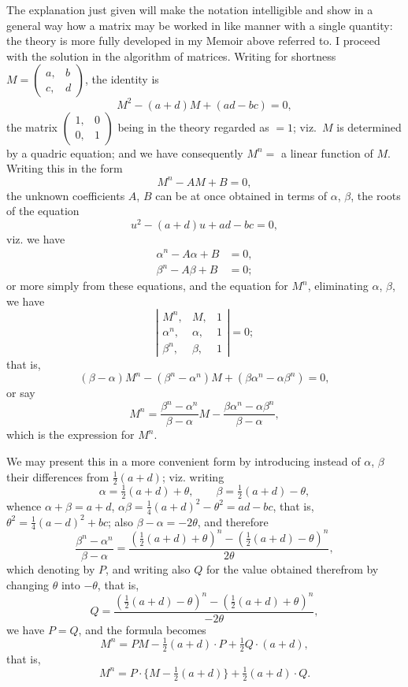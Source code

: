 \documentclass[11pt,a4paper]{book}
\begin{document}
The explanation just given will make the notation intelligible and show in a
general way how a matrix may be worked in like manner with a single quantity:
the theory is more fully developed in my Memoir above referred to. I proceed
with the solution in the algorithm of matrices. Writing for shortness
$M = \left(\begin{array}{c|c} a, & b \\ \hline c, & d \end{array}\right)$,
the identity is
%
\[
M^2 - (a+d)M + (ad-bc) = 0,
\]
%
the matrix $\left(\begin{array}{c|c} 1, & 0 \\ \hline 0, & 1 \end{array}\right)$ being in the theory regarded as $=1$;
viz.\ $M$ is determined by a quadric equation; and we have consequently $M^n =$
a linear function of $M$. Writing this in the form
%
\[
M^n - AM + B = 0,
\]
%
the unknown coefficients $A$, $B$ can be at once obtained in terms of $\alpha$, $\beta$, the roots
of the equation
%
\[
u^2 - (a+d)u + ad - bc = 0,\]
%
viz. we have
\begin{align*}
\alpha^n - A\alpha + B &= 0, \\
\beta^n - A\beta + B &= 0;
\end{align*}
or more simply from these equations, and the equation for $M^n$, eliminating $\alpha$, $\beta$, we
have
%
\[
\left|\begin{array}{ccc}
M^n, & M, & 1 \\
\alpha^n, & \alpha, & 1 \\
\beta^n, & \beta, & 1
\end{array}\right| = 0;
\]
%
that is,
%
\[
(\beta - \alpha) M^n - (\beta^n - \alpha^n) M + (\beta\alpha^n - \alpha\beta^n) = 0,
\]
%
or say
%
\[
M^n = \frac{\beta^n - \alpha^n}{\beta - \alpha} M
- \frac{\beta\alpha^n - \alpha\beta^n}{\beta - \alpha},
\]
%
which is the expression for $M^n$.

We may present this in a more convenient form by introducing instead of
$\alpha$, $\beta$ their differences from $\tfrac{1}{2}(a+d)$; viz. writing
%
\[
\alpha = \tfrac{1}{2}(a+d) + \theta, \qquad
\beta = \tfrac{1}{2}(a+d) - \theta,
\]
%
whence $\alpha + \beta = a + d$, $\alpha\beta = \tfrac{1}{4}(a+d)^2 - \theta^2 = ad-bc$, that is,
$\theta^2 = \tfrac{1}{4}(a-d)^2 + bc$; also $\beta - \alpha = -2\theta$, and therefore
%
\[
\frac{\beta^n - \alpha^n}{\beta - \alpha}
= \frac{(\tfrac{1}{2}(a+d) + \theta)^n - (\tfrac{1}{2}(a+d) - \theta)^n}{2\theta},
\]
%
which denoting by $P$, and writing also $Q$ for the value obtained therefrom by
changing $\theta$ into $-\theta$, that is,
%
\[
Q = \frac{(\tfrac{1}{2}(a+d) - \theta)^n - (\tfrac{1}{2}(a+d) + \theta)^n}{-2\theta},
\]
we have $P = Q$, and the formula becomes
%
\[
M^n = PM - \tfrac{1}{2} (a+d) \cdot P + \tfrac{1}{2} Q \cdot (a+d),
\]
%
that is,
%
\[
M^n = P \cdot \{M - \tfrac{1}{2}(a+d)\} + \tfrac{1}{2}(a+d) \cdot Q.
\]
\end{document}
